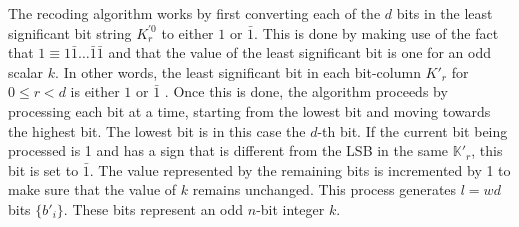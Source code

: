 %
The recoding algorithm works by first converting each of the $d$ bits in the least significant bit string $K_r^{'0}$ to either $1$ or $\bar{1}$.
This is done by making use of the fact that $1 \equiv 1\bar{1}\dots \bar{1}\bar{1}$ and that the value of the least significant bit is one for an odd scalar $k$. In other words, the least significant bit in each bit-column $K'_r$ for $0 \le r < d$ is either $1$ or $\bar{1}$ \cite{feng2005efficient}.
Once this is done, the algorithm proceeds by processing each bit at a time, starting from the lowest bit and moving towards the highest bit.
The lowest bit is in this case the $d$-th bit.
If the current bit being processed is 1 and has a sign that is different from the LSB in the same $\mathbb{K}'_r$, this bit is set to $\bar{1}$.
The value represented by the remaining bits is incremented by 1 to make sure that the value of $k$ remains unchanged.
This process generates $l = wd$ bits $\{b'_i\}$.
These bits represent an odd $n$-bit integer $k$. 

